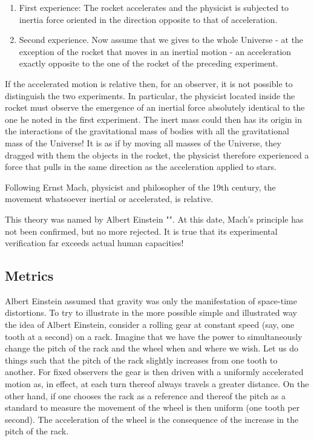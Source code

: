 	\begin{enumerate}
		\item First experience: The rocket accelerates and the physicist is subjected to inertia force oriented in the direction opposite to that of acceleration.
		
		\item Second experience. Now assume that we gives to the whole Universe - at the exception of the rocket that moves in an inertial motion - an acceleration exactly opposite to the one of the rocket of the preceding experiment.
	\end{enumerate}
	If the accelerated motion is relative then, for an observer, it is not possible to distinguish the two experiments. In particular, the physicist located inside the rocket must observe the emergence of an inertial force absolutely identical to the one he noted in the first experiment. The inert mass could then has its origin in the interactions of the gravitational mass of bodies with all the gravitational mass of the Universe! It is as if by moving all masses of the Universe, they dragged with them the objects in the rocket, the physicist therefore experienced a force that pulls in the same direction as the acceleration applied to stars.
	
	Following Ernst Mach, physicist and philosopher of the 19th century, the movement whatsoever inertial or accelerated, is relative.
	
	This theory was named by Albert Einstein "". At this date, Mach's principle has not been confirmed, but no more rejected. It is true that its experimental verification far exceeds actual human capacities!
	
	\subsection{Metrics}
	Albert Einstein assumed that gravity was only the manifestation of space-time distortions. To try to illustrate in the more possible simple and illustrated way the idea of Albert Einstein, consider a rolling gear at constant speed (say, one tooth at a second) on a rack. Imagine that we have the power to simultaneously change the pitch of the rack and the wheel when and where we wish. Let us do things such that the pitch of the rack slightly increases from one tooth to another. For fixed observers the gear is then driven with a uniformly accelerated motion as, in effect, at each turn thereof always travels a greater distance. On the other hand, if one chooses the rack as a reference and thereof the pitch as a standard to measure the movement of the wheel is then uniform (one tooth per second). The acceleration of the wheel is the consequence of the increase in the pitch of the rack.
	
